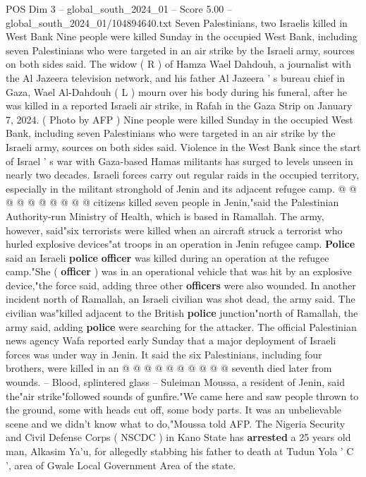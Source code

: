 \begin{textsample}{POS Dim 3 – global\_south\_2024\_01 – Score 5.00 – global\_south\_2024\_01/104894640.txt}  \label{ex:f3_pos_358}
Seven Palestinians, two Israelis killed in West Bank Nine people were killed Sunday in the occupied West Bank, including seven Palestinians who were targeted in an air strike by the Israeli army, sources on both sides said.
The widow ( R ) of Hamza Wael Dahdouh, a journalist with the Al Jazeera television network, and his father Al Jazeera ' s bureau chief in Gaza, Wael Al-Dahdouh ( L ) mourn over his body during his funeral, after he was killed in a reported Israeli air strike, in Rafah in the Gaza Strip on January 7, 2024. ( Photo by AFP ) Nine people were killed Sunday in the occupied West Bank, including seven Palestinians who were targeted in an air strike by the Israeli army, sources on both sides said.
Violence in the West Bank since the start of Israel ' s war with Gaza-based Hamas militants has surged to levels unseen in nearly two decades.
Israeli forces carry out regular raids in the occupied territory, especially in the militant stronghold of Jenin and its adjacent refugee camp. @ @ @ @ @ @ @ @ @ @ citizens killed seven people in Jenin,"said the Palestinian Authority-run Ministry of Health, which is based in Ramallah.
The army, however, said"six terrorists were killed when an aircraft struck a terrorist who hurled explosive devices"at troops in an operation in Jenin refugee camp. \textbf{Police} said an Israeli \textbf{police} \textbf{officer} was killed during an operation at the refugee camp."She ( \textbf{officer} ) was in an operational vehicle that was hit by an explosive device,"the force said, adding three other \textbf{officers} were also wounded.
In another incident north of Ramallah, an Israeli civilian was shot dead, the army said.
The civilian was"killed adjacent to the British \textbf{police} junction"north of Ramallah, the army said, adding \textbf{police} were searching for the attacker.
The official Palestinian news agency Wafa reported early Sunday that a major deployment of Israeli forces was under way in Jenin.
It said the six Palestinians, including four brothers, were killed in an @ @ @ @ @ @ @ @ @ @ seventh died later from wounds. -- Blood, splintered glass -- Suleiman Moussa, a resident of Jenin, said the"air strike"followed sounds of gunfire."We came here and saw people thrown to the ground, some with heads cut off, some body parts.
It was an unbelievable scene and we didn't know what to do,"Moussa told AFP.
The Nigeria Security and Civil Defense Corps ( NSCDC ) in Kano State has \textbf{arrested} a 25 years old man, Alkasim Ya'u, for allegedly stabbing his father to death at Tudun Yola ' C ', area of Gwale Local Government Area of the state.

\end{textsample}
